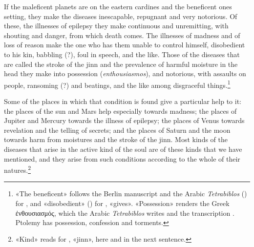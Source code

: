 \documentclass[11pt]{article}
\begin{document}
\par If the maleficent planets are on the eastern cardines and the beneficent ones setting, they make the diseases inescapable, repugnant and very notorious. Of these, the illnesses of epilepsy they make continuous and unremitting, with shouting and danger, from which death comes. The illnesses of madness and of loss of reason make the one who has them unable to control himself, disobedient to his kin, babbling (?), foul in speech, and the like. Those of the diseases that are called the stroke of the jinn and the prevalence of harmful moisture in the head they make into possession (\emph{enthousiasmos}), and notorious, with assaults on people, ransoming (?) and beatings, and the like among disgraceful things.\footnote{«The beneficent» follows the Berlin manuscript and the Arabic \emph{Tetrabiblos} () for , and «disobedient» () for , «gives». «Possession» renders the Greek ἐνθουσιασμός, which the Arabic \emph{Tetrabiblos} writes  and the transcription . Ptolemy has possession, confession and torments.}\par
\par Some of the places in which that condition is found give a particular help to it: the places of the sun and Mars help especially towards madness; the places of Jupiter and Mercury towards the illness of epilepsy; the places of Venus towards revelation and the telling of secrets; and the places of Saturn and the moon towards harm from moistures and the stroke of the jinn. Most kinds of the diseases that arise in the active kind of the soul are of these kinds that we have mentioned, and they arise from such conditions according to the whole of their natures.\footnote{«Kind» reads  for , «jinn», here and in the next sentence.}\par
\end{document}
